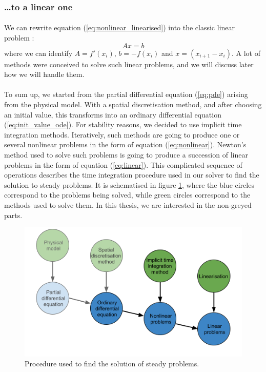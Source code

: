       \subsubsection{\dots to a linear one}

        \paragraph{}
        We can rewrite equation (\ref{eq:nonlinear_linearised}) into the classic linear problem :
        \begin{equation}\label{eq:linear}
          Ax = b
        \end{equation}
        where we can identify $A = f'\left(x_i\right)$, $b = -f\left(x_i\right)$ and $x = \left( x_{i+1} - x_i \right)$.
        A lot of methods were conceived to solve such linear problems, and we will discuss later how we will handle them.


      \paragraph{}
      To sum up, we started from the partial differential equation (\ref{eq:pde}) arising from the physical model.
      With a spatial discretisation method, and after choosing an initial value, this transforms into an ordinary differential equation (\ref{eq:init_value_ode}).
      For stability reasons, we decided to use implicit time integration methods.
      Iteratively, such methods are going to produce one or several nonlinear problems in the form of equation (\ref{eq:nonlinear}).
      Newton's method used to solve such problems is going to produce a succession of linear problems in the form of equation (\ref{eq:linear}).
      This complicated sequence of operations describes the time integration procedure used in our solver to find the solution to steady problems.
      It is schematised in figure \ref{fig:steady_solve}, where the blue circles correspond to the problems being solved, while green circles correspond to the methods used to solve them.
      In this thesis, we are interested in the non-greyed parts.

      \begin{figure}
        \centering
        \includegraphics[width=.8\textwidth]{figures/steady_solve.png}
        \caption{Procedure used to find the solution of steady problems.}
        \label{fig:steady_solve}
      \end{figure}


